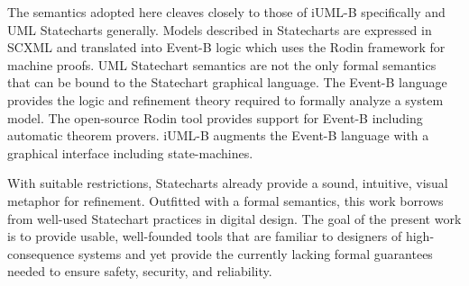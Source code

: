 The semantics adopted here cleaves closely to those of iUML-B
specifically and UML Statecharts\cite{Alexandre} generally.
 Models
described in Statecharts are expressed in SCXML and translated into
Event-B logic which uses the Rodin framework\cite{Abrial} for machine
proofs.  UML Statechart semantics are not the only formal semantics
that can be bound to the Statechart graphical
language\cite{Eshuis_2009}.
%
The Event-B language
\cite{abrial10:_model_event_b} provides the logic and refinement
theory required to formally analyze a system model.  The open-source
Rodin tool \cite{abrial10:_rodin} provides support for Event-B
including automatic theorem provers.  iUML-B \cite{snook14:_b_statem}
augments the Event-B language with a graphical interface including
state-machines.  

With suitable restrictions, Statecharts already provide a sound,
intuitive, visual metaphor for refinement. Outfitted with a formal
semantics, this work borrows from well-used Statechart practices in
digital design.  The goal of the present work is to provide usable,
well-founded tools that are familiar to designers of high-consequence
systems and yet provide the currently lacking formal guarantees needed
to ensure safety, security, and reliability.
